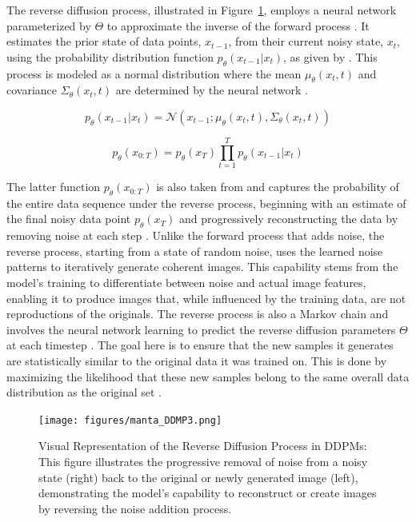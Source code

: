 The reverse diffusion process, illustrated in Figure~\ref{fig:figureReverseProcess}, employs a neural network parameterized by \(\Theta\) to approximate the inverse of the forward process \citep{sohlDDPM, yangdiffusionSummary}. It estimates the prior state of data points, \( x_{t-1} \), from their current noisy state, \( x_t \), using the probability distribution function \( p_\theta(x_{t-1} | x_t) \), as given by \citeauthor{martinez2023understanding}. This process is modeled as a normal distribution where the mean \( \mu_\theta(x_t, t) \) and covariance \( \Sigma_\theta(x_t, t) \) are determined by the neural network \citep{yangdiffusionSummary}.

\[
  p_\theta(x_{t-1} | x_t) = \mathcal{N}(x_{t-1}; \mu_\theta(x_t, t), \Sigma_\theta(x_t, t))
\] 

\[p_\theta(x_{0:T}) = p_\theta(x_{T}) \prod_{t=1}^T p_\theta(x_{t-1} | x_t) \]

The latter function \(p_\theta(x_{0:T})\) is also taken from \citeauthor{martinez2023understanding} and captures the probability of the entire data sequence under the reverse process, beginning with an estimate of the final noisy data point \(p_\theta(x_{T})\) and progressively reconstructing the data by removing noise at each step \citep{hoDDPMs,martinez2023understanding}. Unlike the forward process that adds noise, the reverse process, starting from a state of random noise, uses the learned noise patterns to iteratively generate coherent images. This capability stems from the model's training to differentiate between noise and actual image features, enabling it to produce images that, while influenced by the training data, are not reproductions of the originals. The reverse process is also a Markov chain and involves the neural network learning to predict the reverse diffusion parameters \(\Theta\) at each timestep \citep{yangdiffusionSummary}. The goal here is to ensure that the new samples it generates are statistically similar to the original data it was trained on. This is done by maximizing the likelihood that these new samples belong to the same overall data distribution as the original set \citep{yangdiffusionSummary}.

\begin{figure}[ht]
  \centering
    \texttt{[image: figures/manta\_DDMP3.png]}
    \caption{Visual Representation of the Reverse Diffusion Process in DDPMs: This figure illustrates the progressive removal of noise from a noisy state (right) back to the original or newly generated image (left), demonstrating the model's capability to reconstruct or create images by reversing the noise addition process.}\label{fig:figureReverseProcess}
\end{figure}


